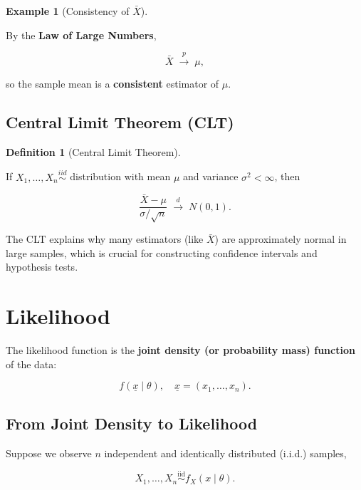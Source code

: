 \documentclass[
  letterpaper,
  DIV=11,
  numbers=noendperiod]{scrreprt}
\theoremstyle{definition}
\newtheorem{example}{Example}[chapter]
\theoremstyle{plain}
\theoremstyle{definition}
\newtheorem{definition}{Definition}[chapter]
\theoremstyle{remark}
\begin{document}
\begin{example}[Consistency of
\(\bar{X}\)]\protect\hypertarget{exm-consistency-samplemean}{}\label{exm-consistency-samplemean}

By the \textbf{Law of Large Numbers},

\[
\bar{X} \;\xrightarrow{p}\; \mu,
\]

so the sample mean is a \textbf{consistent} estimator of \(\mu\).

\end{example}

\section{Central Limit Theorem (CLT)}\label{central-limit-theorem-clt}

\begin{definition}[Central Limit
Theorem]\protect\hypertarget{def-clt}{}\label{def-clt}

If \(X_1,\dots,X_n \overset{iid}{\sim}\) distribution with mean \(\mu\)
and variance \(\sigma^2 < \infty\), then

\[
\frac{\bar{X}-\mu}{\sigma/\sqrt{n}} \;\xrightarrow{d}\; N(0,1).
\]

\end{definition}

The CLT explains why many estimators (like \(\bar{X}\)) are
approximately normal in large samples, which is crucial for constructing
confidence intervals and hypothesis tests.

\chapter{Likelihood}\label{likelihood}

The likelihood function is the \textbf{joint density (or probability
mass) function} of the data:

\[
f(\underline{x} \mid \theta), \quad \underline{x} = (x_1, \dots, x_n).
\]

\section{From Joint Density to
Likelihood}\label{from-joint-density-to-likelihood}

Suppose we observe \(n\) independent and identically distributed
(i.i.d.) samples,

\[
X_1, \dots, X_n \overset{\text{iid}}{\sim} f_X(x \mid \theta).
\]
\end{document}

